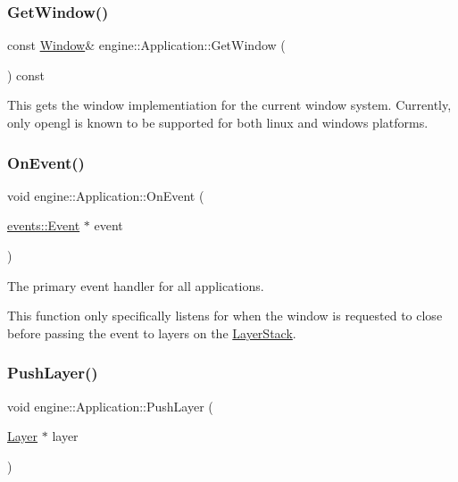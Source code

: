 \subsubsection{\texorpdfstring{Get\+Window()}{GetWindow()}}
{\footnotesize\ttfamily const \hyperlink{classengine_1_1Window}{Window}\& engine\+::\+Application\+::\+Get\+Window (\begin{DoxyParamCaption}{ }\end{DoxyParamCaption}) const\hspace{0.3cm}{\ttfamily [inline]}}

This gets the window implementiation for the current window system. Currently, only opengl is known to be supported for both linux and windows platforms. \mbox{\label{classengine_1_1Application_a093e14152fc1eda1b5eba682a2b4afd9}} 
\subsubsection{\texorpdfstring{On\+Event()}{OnEvent()}}
{\footnotesize\ttfamily void engine\+::\+Application\+::\+On\+Event (\begin{DoxyParamCaption}\item[{\hyperlink{classengine_1_1events_1_1Event}{events\+::\+Event} $\ast$}]{event }\end{DoxyParamCaption})}

The primary event handler for all applications.

This function only specifically listens for when the window is requested to close before passing the event to layers on the \hyperlink{classengine_1_1LayerStack}{Layer\+Stack}. \mbox{\label{classengine_1_1Application_adb129a86a6cdbd80b25094d08605d213}} 
\subsubsection{\texorpdfstring{Push\+Layer()}{PushLayer()}}
{\footnotesize\ttfamily void engine\+::\+Application\+::\+Push\+Layer (\begin{DoxyParamCaption}\item[{\hyperlink{classengine_1_1Layer}{Layer} $\ast$}]{layer }\end{DoxyParamCaption})}

